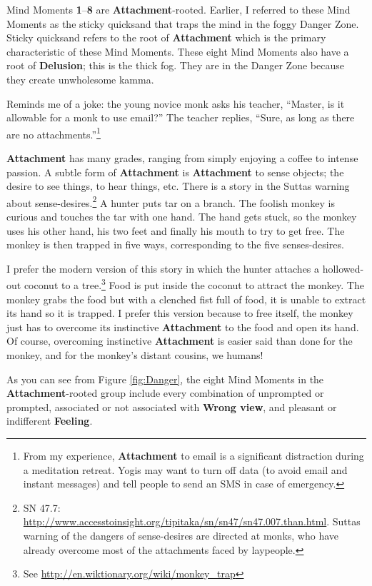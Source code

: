 Mind Moments \textbf{1}--\textbf{8} are \textbf{Attachment}-rooted. Earlier, I referred to these Mind Moments as the sticky quicksand that traps the mind in the foggy Danger Zone. Sticky quicksand refers to the root of \textbf{Attachment} which is the primary characteristic of these Mind Moments. These eight Mind Moments also have a root of \textbf{Delusion}; this is the thick fog. They are in the Danger Zone because they create unwholesome kamma.

Reminds me of a joke: the young novice monk asks his teacher, “Master, is it allowable for a monk to use email?” The teacher replies, “Sure, as long as there are no attachments.”\footnote{From my experience, \textbf{Attachment} to email is a significant distraction during a meditation retreat. Yogis may want to turn off data (to avoid email and instant messages) and tell people to send an SMS in case of emergency.}

\textbf{Attachment} has many grades, ranging from simply enjoying a coffee to intense passion. A subtle form of \textbf{Attachment} is \textbf{Attachment} to sense objects; the desire to see things, to hear things, etc. There is a story in the Suttas warning about sense-desires.\footnote{SN 47.7: \url{http://www.accesstoinsight.org/tipitaka/sn/sn47/sn47.007.than.html}. Suttas warning of the dangers of sense-desires are directed at monks, who have already overcome most of the attachments faced by laypeople.} A hunter puts tar on a branch. The foolish monkey is curious and touches the tar with one hand. The hand gets stuck, so the monkey uses his other hand, his two feet and finally his mouth to try to get free. The monkey is then trapped in five ways, corresponding to the five senses-desires. 

I prefer the modern version of this story in which the hunter attaches a hollowed-out coconut to a tree.\footnote{See \url{http://en.wiktionary.org/wiki/monkey_trap}} Food is put inside the coconut to attract the monkey. The monkey grabs the food but with a clenched fist full of food, it is unable to extract its hand so it is trapped. I prefer this version because to free itself, the monkey just has to overcome its instinctive \textbf{Attachment} to the food and open its hand. Of course, overcoming instinctive \textbf{Attachment} is easier said than done for the monkey, and for the monkey’s distant cousins, we humans!

As you can see from Figure \ref{fig:Danger}, the eight Mind Moments in the \textbf{Attachment}-rooted group include every combination of unprompted or prompted, associated or not associated with \textbf{Wrong view}, and pleasant or indifferent \textbf{Feeling}.

